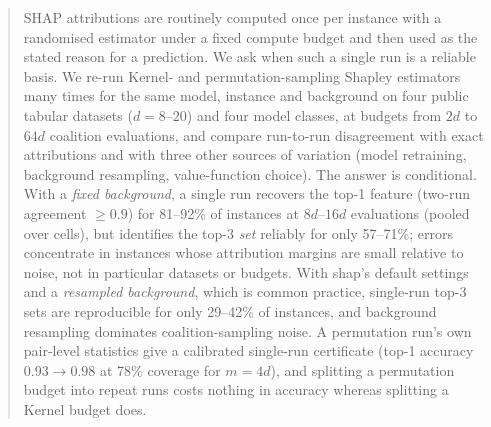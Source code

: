 \documentclass{article}
\begin{document}
\printAffiliationsAndNotice{}

\begin{abstract}
SHAP attributions are routinely computed once per instance with a randomised estimator under a fixed compute budget and then used as the stated reason for a prediction. We ask when such a single run is a reliable basis.
We re-run Kernel- and permutation-sampling Shapley estimators many times for the same model, instance and background on four public tabular datasets ($d=8$--$20$) and four model classes, at budgets from $2d$ to $64d$ coalition evaluations, and compare run-to-run disagreement with exact attributions and with three other sources of variation (model retraining, background resampling, value-function choice).
The answer is conditional.
With a \emph{fixed background}, a single run recovers the top-1 feature (two-run agreement $\ge0.9$) for 81--92\% of instances at $8d$--$16d$ evaluations (pooled over cells), but identifies the top-3 \emph{set} reliably for only 57--71\%; errors concentrate in instances whose attribution margins are small relative to noise, not in particular datasets or budgets.
With shap's default settings and a \emph{resampled background}, which is common practice, single-run top-3 sets are reproducible for only 29--42\% of instances, and background resampling dominates coalition-sampling noise.
A permutation run's own pair-level statistics give a calibrated single-run certificate (top-1 accuracy $0.93\!\to\!0.98$ at 78\% coverage for $m=4d$), and splitting a permutation budget into repeat runs costs nothing in accuracy whereas splitting a Kernel budget does.
\end{abstract}
\end{document}
